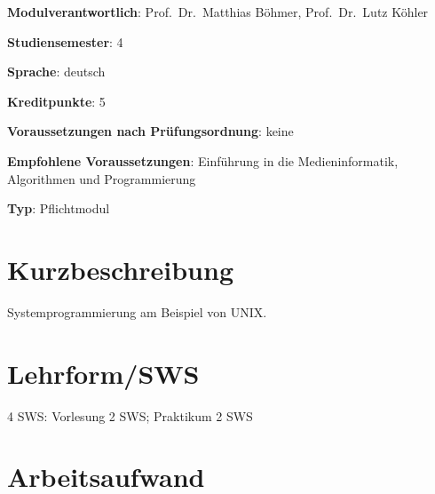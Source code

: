\begin{modulHead}
\textbf{Modulverantwortlich}: Prof.~Dr.~Matthias
Böhmer, Prof.~Dr.~Lutz
Köhler
\end{modulHead}
\begin{modulHead}
\textbf{Studiensemester}:
4
\end{modulHead}
\begin{modulHead}
\textbf{Sprache}:
deutsch
\end{modulHead}
\begin{modulHead}
\textbf{Kreditpunkte}:
5
\end{modulHead}
\begin{modulHead}
\textbf{Voraussetzungen nach
Prüfungsordnung}:
keine
\end{modulHead}
\begin{modulHead}
\textbf{Empfohlene
Voraussetzungen}: Einführung in die Medieninformatik, Algorithmen und
Programmierung
\end{modulHead}
\begin{modulHead}
\textbf{Typ}:
Pflichtmodul
\end{modulHead}


\section*{Kurzbeschreibung\label{/mi-2017/modulbeschreibungen-bachelor/BA_betriebssysteme-und-verteile-systeme}}\label{kurzbeschreibungpathlabelmi-2017modulbeschreibungen-bachelorbaux5fbetriebssysteme-und-verteile-systeme}

Systemprogrammierung am Beispiel von UNIX.

\section*{Lehrform/SWS\label{/mi-2017/modulbeschreibungen-bachelor/BA_betriebssysteme-und-verteile-systeme}}\label{lehrformswspathlabelmi-2017modulbeschreibungen-bachelorbaux5fbetriebssysteme-und-verteile-systeme}

4 SWS: Vorlesung 2 SWS; Praktikum 2 SWS

\section*{Arbeitsaufwand\label{/mi-2017/modulbeschreibungen-bachelor/BA_betriebssysteme-und-verteile-systeme}}\label{arbeitsaufwandpathlabelmi-2017modulbeschreibungen-bachelorbaux5fbetriebssysteme-und-verteile-systeme}

